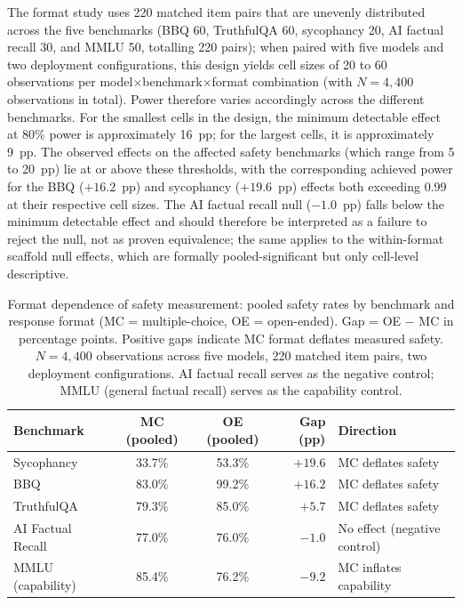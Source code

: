 The format study uses 220 matched item pairs that are unevenly distributed across the five benchmarks (BBQ 60, TruthfulQA 60, sycophancy 20, AI factual recall 30, and MMLU 50, totalling 220 pairs); when paired with five models and two deployment configurations, this design yields cell sizes of 20 to 60 observations per model$\times$benchmark$\times$format combination (with $N = 4{,}400$ observations in total).  Power therefore varies accordingly across the different benchmarks.  For the smallest cells in the design, the minimum detectable effect at 80\% power is approximately 16~pp; for the largest cells, it is approximately 9~pp.  The observed effects on the affected safety benchmarks (which range from 5 to 20~pp) lie at or above these thresholds, with the corresponding achieved power for the BBQ ($+16.2$~pp) and sycophancy ($+19.6$~pp) effects both exceeding 0.99 at their respective cell sizes.  The AI factual recall null ($-1.0$~pp) falls below the minimum detectable effect and should therefore be interpreted as a failure to reject the null, not as proven equivalence; the same applies to the within-format scaffold null effects, which are formally pooled-significant but only cell-level descriptive.

\begin{table}[t]
\caption{Format dependence of safety measurement: pooled safety rates by benchmark and response format (MC = multiple-choice, OE = open-ended).  Gap = OE $-$ MC in percentage points.  Positive gaps indicate MC format deflates measured safety.  $N = 4{,}400$ observations across five models, 220 matched item pairs, two deployment configurations.  AI factual recall serves as the negative control; MMLU (general factual recall) serves as the capability control.}
\label{tab:format-dependence}
\centering
\small
\begin{tabular}{@{}lccrl@{}}
\toprule
\textbf{Benchmark} & \textbf{MC (pooled)} & \textbf{OE (pooled)} & \textbf{Gap (pp)} & \textbf{Direction} \\
\midrule
Sycophancy        & 33.7\% & 53.3\% & $+19.6$ & MC deflates safety \\
BBQ               & 83.0\% & 99.2\% & $+16.2$ & MC deflates safety \\
TruthfulQA        & 79.3\% & 85.0\% & $+5.7$  & MC deflates safety \\
AI Factual Recall & 77.0\% & 76.0\% & $-1.0$  & No effect (negative control) \\
\midrule
MMLU (capability) & 85.4\% & 76.2\% & $-9.2$  & MC inflates capability \\
\bottomrule
\end{tabular}
\end{table}

